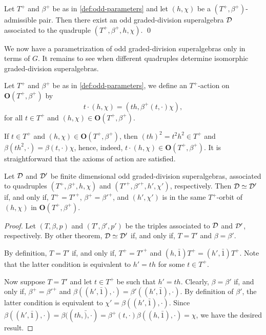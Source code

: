 \begin{prop}\label{prop:D-defined-by-quadruple}
    Let $T^+$ and $\beta^+$ be as in \cref{def:odd-parameters} and let $(h, \chi)$ be a $(T^+, \beta^+)$-admissible pair. 
    Then there exist an odd graded-division superalgebra $\mathcal{D}$ associated to the quadruple $(T^+, \beta^+, h,\chi)$. \qed
\end{prop}

We now have a parametrization of odd graded-division superalgebras only in terms of $G$. 
It remains to see when different quadruples determine isomorphic graded-division superalgebras. 

\begin{defi}\label{def:T^+-action}
    Let $T^+$ and $\beta^+$ be as in \cref{def:odd-parameters}, we define an $T^+$-action on $\mathbf{O} (T^+, \beta^+)$ by
    \[
        t \cdot (h, \chi) = (th, \beta^+(t, \cdot) \chi),
    \]
    for all $t\in T^+$ and $(h, \chi) \in \mathbf{O} (T^+, \beta^+)$.
\end{defi}

If $t\in T^+$ and $(h, \chi) \in \mathbf {O} (T^+, \beta^+)$, then $(th)^2 = t^2h^2\in T^+$ and $\beta(th^2, \cdot) = \beta(t, \cdot) \chi$, hence, indeed, $t \cdot (h, \chi) \in \mathbf {O} (T^+, \beta^+)$. 
It is straightforward that the axioms of action are satisfied. 

\begin{thm}\label{thm:iso-odd-D-only-G}
    Let $\mathcal{D}$ and $\mathcal{D}'$ be finite dimensional odd graded-division superalgebras, associated to quadruples $(T^+, \beta^+, h, \chi)$ and $(T'^+, \beta'^+, h', \chi')$, respectively. 
    Then $\mathcal{D} \simeq \mathcal{D}'$ if, and only if, $T^+ = T'^+$, $\beta^+ = \beta'^+$, and $(h', \chi')$ is in the same $T^+$-orbit of $(h, \chi)$ in $\mathbf {O} (T^+, \beta^+)$. 
\end{thm}

\begin{proof}
    Let $(T, \beta, p)$ and $(T', \beta', p')$ be the triples associated to $\mathcal{D}$ and $\mathcal{D}'$, respectively. 
    By other theorem, $\mathcal{D} \simeq \mathcal{D}'$ if, and only if, $T= T'$ and $\beta = \beta'$. 
    
    By definition, $T= T'$ if, and only if, $T^+ = T'^+$ and $(h, \bar 1)T^+ = (h', \bar 1)T^+$. 
    Note that the latter condition is equivalent to 
    $h' = th$ for some $t\in T^+$. 
    
    Now suppose $T= T'$ and let $t\in T^+$ be such that $h' = th$. 
    Clearly, $\beta = \beta'$ if, and only if, 
    $\beta^+ = \beta'^+$ and $\beta((h', \bar 1), \cdot) = \beta'((h', \bar 1), \cdot)$. 
    By definition of $\beta'$, the latter condition is equivalent to $\chi' = \beta((h', \bar 1), \cdot)$. 
    Since $\beta((h', \bar 1), \cdot) = \beta ((th, \bar), \cdot) = \beta^+ (t, \cdot) \beta ((h, \bar 1), \cdot) = \chi$, we have the desired result. 
\end{proof}

